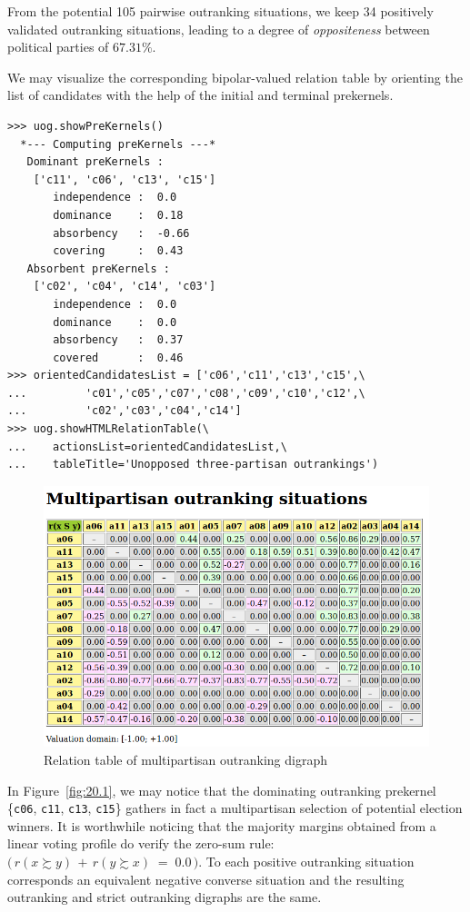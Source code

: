 From the potential 105 pairwise outranking situations, we keep 34 positively validated outranking situations, leading to a degree of \emph{oppositeness} between political parties of $67.31\%$.

We may visualize the corresponding bipolar-valued relation table by orienting the list of candidates with the help of the initial and terminal prekernels.
\begin{lstlisting}[caption={Computing unopposed multiobjective outranking situations},label=list:20.4]
>>> uog.showPreKernels()
  *--- Computing preKernels ---*
   Dominant preKernels :
    ['c11', 'c06', 'c13', 'c15']
       independence :  0.0
       dominance    :  0.18
       absorbency   :  -0.66
       covering     :  0.43
   Absorbent preKernels :
    ['c02', 'c04', 'c14', 'c03']
       independence :  0.0
       dominance    :  0.0
       absorbency   :  0.37
       covered      :  0.46
>>> orientedCandidatesList = ['c06','c11','c13','c15',\
...         'c01','c05','c07','c08','c09','c10','c12',\
...         'c02','c03','c04','c14']
>>> uog.showHTMLRelationTable(\
...    actionsList=orientedCandidatesList,\
...    tableTitle='Unopposed three-partisan outrankings')
\end{lstlisting}

\begin{figure}[ht]
\includegraphics[width=0.9\hsize]{Figures/20-1-unOpposedOutrankings.png}
\caption{Relation table of multipartisan outranking digraph} 
\label{fig:20.1}       %
\end{figure}

In Figure~\vref{fig:20.1}, we may notice that the dominating outranking prekernel \{\texttt{c06}, \texttt{c11}, \texttt{c13}, \texttt{c15}\} gathers in fact a multipartisan selection of potential election winners. It is worthwhile noticing that the majority margins obtained from a linear voting profile do verify the zero-sum rule: $\big(\,r(x \succsim y) \,+\, r(y \succsim x) \;=\; 0.0\,\big)$. To each positive outranking situation corresponds an equivalent negative converse situation and the resulting outranking and strict outranking digraphs are the same.

